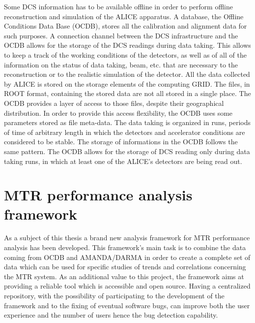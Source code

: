Some DCS information has to be available offline in order to perform offline reconstruction and simulation of the ALICE apparatus.
A database, the Offline Conditions Data Base (OCDB), stores all the calibration and alignment data for such purposes.
A connection channel between the DCS infrastructure and the OCDB allows for the storage of the DCS readings during data taking.
This allows to keep a track of the working conditions of the detectors, as well as of all of the information on the status of data taking, beam, etc. that are necessary to the reconstruction or to the realistic simulation of the detector.
All the data collected by ALICE is stored on the storage elements of the computing GRID.
The files, in ROOT format, containing the stored data are not all stored in a single place.
The OCDB provides a layer of access to those files, despite their geographical distribution.
In order to provide this access flexibility, the OCDB uses some parameters stored as file meta-data.
The data taking is organized in runs, periods of time of arbitrary length in which the detectors and accelerator conditions are considered to be stable.
The storage of informations in the OCDB follows the same pattern.
The OCDB allows for the storage of DCS reading only during data taking runs, in which at least one of the ALICE's detectors are being read out.

\section{MTR performance analysis framework}
As a subject of this thesis a brand new analysis framework for MTR performance analysis has been developed.
This framework's main task is to combine the data coming from OCDB and AMANDA/DARMA in order to create a complete set of data which can be used for specific studies of trends and correlations concerning the MTR system.
As an additional value to this project, the framework aims at providing a reliable tool which is accessible and open source.
Having a centralized repository, with the possibility of participating to the development of the framework and to the fixing of eventual software bugs, can improve both the user experience and the number of users hence the bug detection capability.

